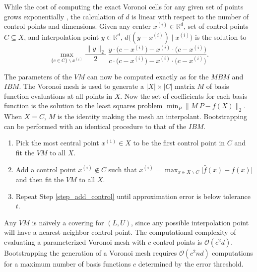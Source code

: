 While the cost of computing the exact Voronoi cells for any given set of points grows exponentially \cite{dutour2009complexity}, the calculation of $d$ is linear with respect to the number of control points and dimensions. Given any center $x^{(i)} \in \mathbb{R}^d$, set of control points $C \subseteq X$, and interpolation point $y \in \mathbb{R}^d$, $d\bigl((y-x^{(i)}) \mid x^{(i)}\bigr)$ is the solution to
\begin{equation}
  \max_{\{c \in C\}\backslash x^{(i)}} \frac{\|y\|_2}{2} \ \frac{y \cdot \bigl(c - x^{(i)}\bigr) - x^{(i)} \cdot \bigl(c - x^{(i)}\bigr)}{c \cdot \bigl(c - x^{(i)}\bigr) - x^{(i)} \cdot \bigl(c - x^{(i)}\bigr)}.
\end{equation}

The parameters of the $VM$ can now be computed exactly as for the $MBM$ and $IBM$. The Voronoi mesh is used to generate a $|X| \times |C|$ matrix $M$ of basis function evaluations at all points in $X$. Now the set of coefficients for each basis function is the solution to the least squares problem $\min_P \bigl\| M \ P - f(X) \bigr\|_2$. When $X = C$, $M$ is the identity making the mesh an interpolant. Bootstrapping can be performed with an identical procedure to that of the $IBM$.
\begin{enumerate}
\item Pick the most central point $x^{(1)} \in X$ to be the first control point in $C$ and fit the $VM$ to all $X$.
\item Add a control point $x^{(i)} \notin C$ such that $x^{(i)} = \max_{x \in X \backslash C} \bigl| \hat f(x) - f(x) \bigr|$ and then fit the $VM$ to all $X$. \label{step_add_control}
\item Repeat Step \ref{step_add_control} until approximation error is below tolerance $t$.
\end{enumerate}

Any $VM$ is na\"{\i}vely a covering for $(L,U)$, since any possible interpolation point will have a nearest neighbor control point. The computational complexity of evaluating a parameterized Voronoi mesh with $c$ control points is $\mathcal{O}(c^2 d)$. Bootstrapping the generation of a Voronoi mesh requires $\mathcal{O}(c^2 n d)$ computations for a maximum number of basis functions $c$ determined by the error threshold.


